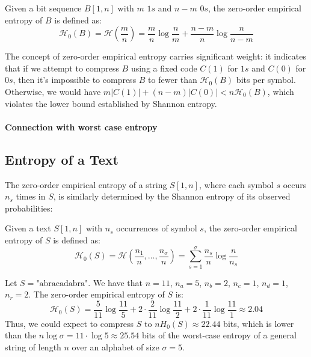 \begin{definition}
    Given a bit sequence $B[1, n]$ with $m$ $1s$ and $n-m$ $0s$, the zero-order empirical entropy of $B$ is defined as:
    \begin{equation}
        \mathcal{H}_0(B) = \mathcal{H} \left( \frac{m}{n} \right) =\frac{m}{n} \log \frac{n}{m} + \frac{n-m}{n} \log \frac{n}{n-m}
    \end{equation}
\end{definition}
\noindent The concept of zero-order empirical entropy carries significant weight: it indicates that if we attempt to compress $B$ using a fixed code $C(1)$ for $1s$ and $C(0)$ for $0s$, then it's impossible to compress $B$ to fewer than $\mathcal{H}_0(B)$ bits per symbol. Otherwise, we would have $m |C(1)| + (n-m) |C(0)| < n \mathcal{H}_0(B)$, which violates the lower bound established by Shannon entropy.

\paragraph{Connection with worst case entropy}

\subsection{Entropy of a Text}

The zero-order empirical entropy of a string $S[1, n]$, where each symbol $s$ occurs $n_s$ times in $S$, is similarly determined by the Shannon entropy of its observed probabilities:

\begin{definition}
    Given a text $S[1, n]$ with $n_s$ occurrences of symbol $s$, the zero-order empirical entropy of $S$ is defined as:
    \begin{equation}
        \mathcal{H}_0(S) = \mathcal{H} \left( \frac{n_1}{n} , \ldots, \frac{n_{\sigma}}{n} \right) =  \sum_{s=1}^{\sigma} \frac{n_s}{n} \log \frac{n}{n_s}
    \end{equation}
\end{definition}

\begin{example}\label{ex:0_order_entropy_abracadabra}
    Let $S = \text{"abracadabra"}$. We have that $n = 11$, $n_a = 5$, $n_b = 2$, $n_c = 1$, $n_d = 1$, $n_r = 2$. The zero-order empirical entropy of $S$ is:
    \[
        \mathcal{H}_0(S) = \frac{5}{11} \log \frac{11}{5} + 2 \cdot \frac{2}{11} \log \frac{11}{2} + 2 \cdot \frac{1}{11} \log \frac{11}{1} \approx 2.04
    \]
    Thus, we could expect to compress $S$ to $n H_0 (S) \approx 22.44$ bits, which is lower than the $n \log \sigma  = 11 \cdot \log 5 \approx 25.54$ bits of the worst-case entropy of a general string of length $n$ over an alphabet of size $\sigma = 5$.
\end{example}

